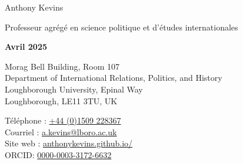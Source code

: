 \documentclass[letterpaper,fontsize=10.5pt]{scrartcl}
\begin{document}


\huge Anthony Kevins\\
\begin{minipage}[t]{.87\linewidth}
	\large Professeur agrégé en science politique et d'études internationales\\
\end{minipage}%
\begin{minipage}[t]{.13\linewidth}
	\raggedleft
	\scriptsize \textbf{Avril 2025}\\
\end{minipage}%
\normalsize

\hrulefill

\begin{minipage}[p]{.6\linewidth}
	\raggedright
	\medskip
	Morag Bell Building, Room 107\\
	Department of International Relations, Politics, and History\\
	Loughborough University, Epinal Way\\
	Loughborough, LE11 3TU, UK\\
	\medskip
\end{minipage}%
\begin{minipage}[p]{.4\linewidth}
	\raggedleft
	\medskip
	Téléphone : \href{tel:+4401509228367}{+44 (0)1509 228367}\\
	Courriel : \href{mailto:a.kevins@lboro.ac.uk}{a.kevins@lboro.ac.uk}\\
	Site web : \href{https://anthonykevins.github.io/fr/}{anthonykevins.github.io/}\\
	ORCID: \href{https://orcid.org/0000-0003-3172-6632}{0000-0003-3172-6632}\\
	\medskip
\end{minipage}%

\hrulefill

\end{document}
